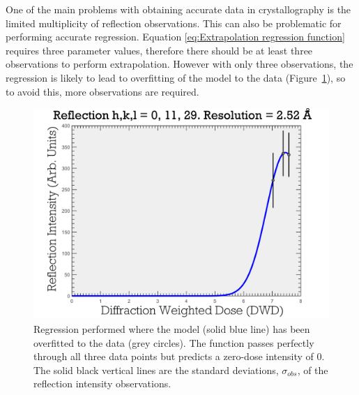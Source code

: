 One of the main problems with obtaining accurate data in crystallography is the limited multiplicity of reflection observations.
This can also be problematic for performing accurate regression.
Equation \ref{eq:Extrapolation regression function} requires three parameter values, therefore there should be at least three observations to perform extrapolation.
However with only three observations, the regression is likely to lead to overfitting of the model to the data (Figure~\ref{fig:Data Overfitting to few data points - Extrapolation method}), so to avoid this, more observations are required.
\begin{figure}
  \centering
    \includegraphics[width=1\textwidth]{figures/zde/ReflectionPlot_h,k,l_0,11,29-3obs.pdf}
    \caption[Poor regression fit: overfitting.]{Regression performed where the model (solid blue line) has been overfitted to the data (grey circles).
    The function passes perfectly through all three data points but predicts a zero-dose intensity of 0.
    The solid black vertical lines are the standard deviations, $\sigma_{obs}$, of the reflection intensity observations.}
    \label{fig:Data Overfitting to few data points - Extrapolation method}
\end{figure}

